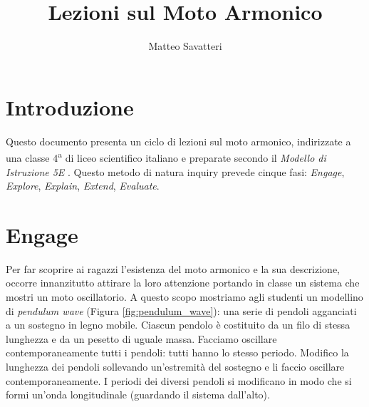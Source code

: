 \documentclass{article}
\title{Lezioni sul Moto Armonico}
\author{Matteo Savatteri}
\begin{document}
\maketitle

\tableofcontents

\section{Introduzione}
Questo documento presenta un ciclo di lezioni sul moto
armonico, indirizzate a una classe 4\textsuperscript{a}
di liceo scientifico italiano e preparate secondo il
\emph{Modello di Istruzione 5E} \cite{bybee2009bscs}.
Questo metodo di natura inquiry prevede cinque fasi:
\emph{Engage}, \emph{Explore},
\emph{Explain}, \emph{Extend}, \emph{Evaluate}.

\section{Engage}
Per far scoprire ai ragazzi l'esistenza del moto armonico e
la sua descrizione, occorre innanzitutto attirare la loro
attenzione portando in classe un sistema che mostri un moto
oscillatorio. A questo scopo mostriamo agli studenti un modellino di
\emph{pendulum wave} (Figura \ref{fig:pendulum_wave}): una
serie di pendoli agganciati a un sostegno in legno mobile.
Ciascun pendolo è costituito da un filo di stessa lunghezza
e da un pesetto di uguale massa. 
Facciamo oscillare contemporaneamente tutti i pendoli:
tutti hanno lo stesso periodo. 
Modifico la lunghezza dei pendoli sollevando un'estremità del
sostegno e li faccio oscillare contemporaneamente. I periodi
dei diversi pendoli si modificano in modo che si formi un'onda
longitudinale (guardando il sistema dall'alto).
\end{document}
